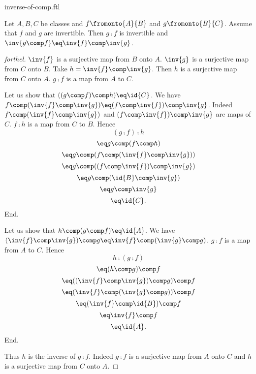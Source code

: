 \documentclass{naproche-library}
\begin{document}
\begin{smodule}[title=The Inverse of a Composition]{inverse-of-comp.ftl}


\begin{proposition}[forthel,id=InvertibilityOfCompProp]
  Let $A, B, C$ be classes and $f \fromonto{A}{B}$ and $g \fromonto{B}{C}$.
  Assume that $f$ and $g$ are invertible.
  Then $g \comp f$ is invertible and $\inv{g \comp f} \eq \inv{f} \comp \inv{g}$.
\end{proposition}
\begin{proof}[forthel]
  $\inv{f}$ is a surjective map from $B$ onto $A$.
  $\inv{g}$ is a surjective map from $C$ onto $B$.
  Take $h = \inv{f} \comp \inv{g}$.
  Then $h$ is a surjective map from $C$ onto $A$.
  $g \comp f$ is a map from $A$ to $C$.

  Let us show that $((g \comp f) \comp h) \eq \id{C}$.
    We have $f \comp (\inv{f} \comp \inv{g}) \eq (f \comp \inv{f}) \comp \inv{g}$.
    Indeed $f \comp (\inv{f} \comp \inv{g})$ and $(f \comp \inv{f}) \comp \inv{g}$ are maps of $C$.
    $f \comp h$ is a map from $C$ to $B$.
    Hence
    \[  (g \comp f) \comp h                           \]
    \[    \eq g \comp (f \comp h)                       \]
    \[    \eq g \comp (f \comp (\inv{f} \comp \inv{g}))   \]
    \[    \eq g \comp ((f \comp \inv{f}) \comp \inv{g})   \]
    \[    \eq g \comp (\id{B} \comp \inv{g})            \]
    \[    \eq g \comp \inv{g}                            \]
    \[    \eq \id{C}.                                  \]
  End.

  Let us show that $h \comp (g \comp f) \eq \id{A}$.
    We have $(\inv{f} \comp \inv{g}) \comp g \eq \inv{f} \comp (\inv{g} \comp g)$.
    $g \comp f$ is a map from $A$ to $C$.
    Hence
    \[  h \comp (g \comp f)                           \]
    \[    \eq (h \comp g) \comp f                       \]
    \[    \eq ((\inv{f} \comp \inv{g}) \comp g) \comp f   \]
    \[    \eq (\inv{f} \comp (\inv{g} \comp g)) \comp f   \]
    \[    \eq (\inv{f} \comp \id{B}) \comp f            \]
    \[    \eq \inv{f} \comp f                            \]
    \[    \eq \id{A}.                                  \]
  End.

  Thus $h$ is the inverse of $g \comp f$.
  Indeed $g \comp f$ is a surjective map from $A$ onto $C$ and $h$ is a surjective map from $C$ onto $A$.
\end{proof}

\end{smodule}
\end{document}
